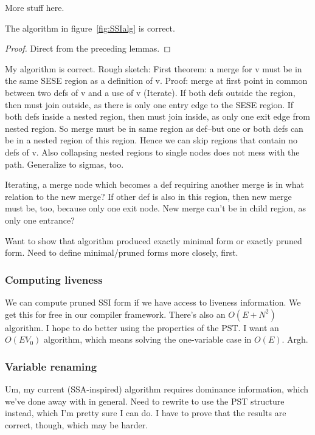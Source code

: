 \documentclass[12pt,titlepage,twoside]{article}
\begin{document}
More stuff here.

\begin{theorem}
The algorithm in figure~\ref{fig:SSIalg} is correct.
\end{theorem}
\begin{proof}
Direct from the preceding lemmas.
\end{proof}

My algorithm is correct.
Rough sketch:
First theorem: a merge for v must be in the same SESE region as a
definition of v.
Proof: merge at first point in common between two defs of v and a use
of v (Iterate). If both defs outside the region, then must join
outside, as there is only one entry edge to the SESE region.  If both
defs inside a nested region, then must join inside, as only one exit
edge from nested region.  So merge must be in same region as def--but
one or both defs can be in a nested region of this region.  Hence we
can skip regions that contain no defs of v. Also collapsing nested
regions to single nodes does not mess with the path.  Generalize to
sigmas, too.

Iterating, a merge node which becomes a def requiring another merge is
in what relation to the new merge?  If other def is also in this
region, then new merge must be, too, because only one exit node.
New merge can't be in child region, as only one entrance?

Want to show that algorithm produced exactly minimal form or exactly
pruned form.  Need to define minimal/pruned forms more closely, first.

\subsubsection{Computing liveness}
We can compute pruned SSI form if we have access to liveness
information.
We get this for free in our compiler framework.  There's also an
$O(E+N^2)$ algorithm.  I hope to do better using the properties of the
PST.  I want an $O(E V_0)$ algorithm, which means solving the
one-variable case in $O(E)$.  Argh.

\subsubsection{Variable renaming}
Um, my current (SSA-inspired) algorithm requires dominance
information, which we've done away with in general.  Need to rewrite
to use the PST structure instead, which I'm pretty sure I can do.
I have to prove that the results are correct, though, which may be harder.%
\end{document}

